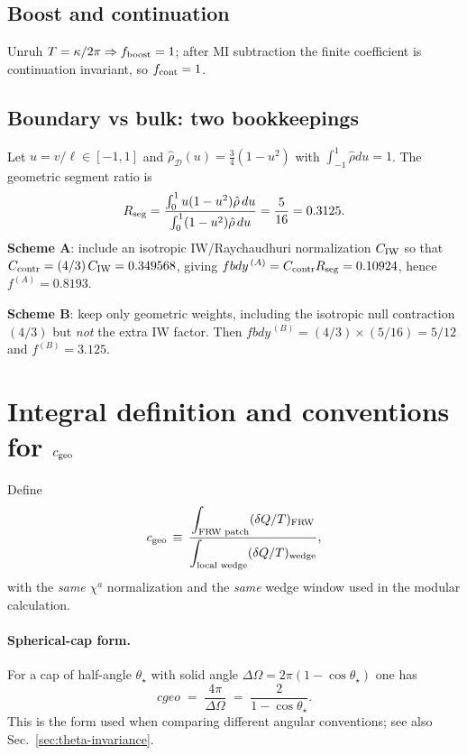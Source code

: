 \documentclass[aps,prd,onecolumn,superscriptaddress,nofootinbib]{revtex4-2}
\def\cgeo{cgeo}%
\def\fbdy{fbdy}%
\newcommand{\cgeo}{c_{\rm geo}}
\newcommand{\fbdy}{f_{\rm bdy}}
\begin{document}
\subsection{Boost and continuation}
Unruh \(T=\kappa/2\pi\Rightarrow f_{\rm boost}=1\); after MI subtraction the finite coefficient is continuation invariant, so \(f_{\rm cont}=1\).

\subsection{Boundary vs bulk: two bookkeepings}
\label{app:fbdy-derivation}
Let \(u=v/\ell\in[-1,1]\) and \(\hat\rho_{\mathcal D}(u)=\tfrac{3}{4}(1-u^2)\) with \(\int_{-1}^1\hat\rho du=1\).
The geometric segment ratio is
\[
R_{\rm seg}=
\frac{\int_{0}^{1} u(1-u^2)\hat\rho\,du}{\int_{0}^{1} (1-u^2)\hat\rho\,du}
=\frac{5}{16}=0.3125.
\]
\textbf{Scheme A}: include an isotropic IW/Raychaudhuri normalization \(C_{\rm IW}\) so that \(C_{\rm contr}=({4}/{3})\,C_{\rm IW}=0.349568\), giving \(\fbdy^{\,(A)}=C_{\rm contr}R_{\rm seg}=0.10924\), hence \(f^{(A)}=0.8193\).

\textbf{Scheme B}: keep only geometric weights, including the isotropic null contraction \((4/3)\) but \emph{not} the extra IW factor. Then \(\fbdy^{\,(B)}=(4/3)\times (5/16)=5/12\) and \(f^{(B)}=3.125\).

\section{Integral definition and conventions for \texorpdfstring{$c_{\rm geo}$}{cgeo}}
\label{sec:cgeo-integral}
Define
\begin{equation}
 c_{\rm geo} \,\equiv\, \frac{\displaystyle \int_{\text{FRW patch}} (\delta Q/T)_{\text{FRW}}}{\displaystyle \int_{\text{local wedge}} (\delta Q/T)_{\text{wedge}}},
 \label{eq:cgeo-def}
\end{equation}
with the \emph{same} \(\chi^a\) normalization and the \emph{same} wedge window used in the modular calculation.

\paragraph*{Spherical-cap form.}
For a cap of half-angle $\theta_\star$ with solid angle $\Delta\Omega=2\pi(1-\cos\theta_\star)$ one has
\begin{equation}
\cgeo \;=\; \frac{4\pi}{\Delta\Omega} \;=\; \frac{2}{1-\cos\theta_\star}.
\end{equation}
This is the form used when comparing different angular conventions; see also Sec.~\ref{sec:theta-invariance}.
\end{document}
